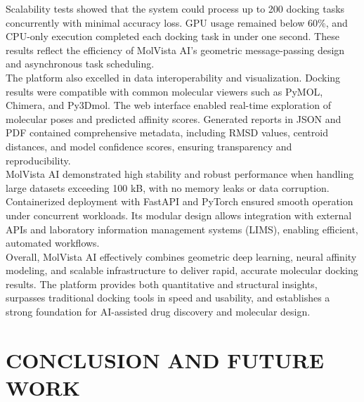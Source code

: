 \documentclass[12pt,a4]{report}
\begin{document}
\hspace{0.3in}Scalability tests showed that the system could process up to 200 docking tasks concurrently with minimal accuracy loss. GPU usage remained below 60\%, and CPU-only execution completed each docking task in under one second. These results reflect the efficiency of MolVista AI’s geometric message-passing design and asynchronous task scheduling.\\

\hspace{0.3in}The platform also excelled in data interoperability and visualization. Docking results were compatible with common molecular viewers such as PyMOL, Chimera, and Py3Dmol. The web interface enabled real-time exploration of molecular poses and predicted affinity scores. Generated reports in JSON and PDF contained comprehensive metadata, including RMSD values, centroid distances, and model confidence scores, ensuring transparency and reproducibility.\\

\hspace{0.3in}MolVista AI demonstrated high stability and robust performance when handling large datasets exceeding 100 kB, with no memory leaks or data corruption. Containerized deployment with FastAPI and PyTorch ensured smooth operation under concurrent workloads. Its modular design allows integration with external APIs and laboratory information management systems (LIMS), enabling efficient, automated workflows.\\

\hspace{0.3in}Overall, MolVista AI effectively combines geometric deep learning, neural affinity modeling, and scalable infrastructure to deliver rapid, accurate molecular docking results. The platform provides both quantitative and structural insights, surpasses traditional docking tools in speed and usability, and establishes a strong foundation for AI-assisted drug discovery and molecular design.\\


\chapter{CONCLUSION AND \vspace*{0.5\baselineskip} FUTURE WORK}
\end{document}
